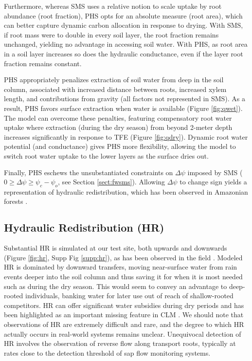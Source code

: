 \documentclass[draft,linenumbers]{agujournal}
\begin{document}
        Furthermore, whereas SMS uses a relative notion to scale uptake by root abundance (root fraction), PHS opts for an absolute measure (root area), which can better capture dynamic carbon allocation in response to drying.
    With SMS, if root mass were to double in every soil layer, the root fraction remains unchanged, yielding no advantage in accessing soil water.
    With PHS, as root area in a soil layer increases so does the hydraulic conductance, even if the layer root fraction remains constant.
    
    PHS appropriately penalizes extraction of soil water from deep in the soil column, associated with increased distance between roots, increased xylem length, and contributions from gravity (all factors not represented in SMS).
    As a result, PHS favors surface extraction when water is available (Figure \ref{fig:qwet}).
    The model can overcome these penalties, featuring compensatory root water uptake where extraction (during the dry season) from beyond 2-meter depth increases significantly in response to TFE (Figure \ref{fig:qdry}).
    Dynamic root water potential (and conductance) gives PHS more flexibility, allowing the model to switch root water uptake to the lower layers as the surface dries out.
   
     Finally, PHS eschews the unsubstantiated constraints on $\Delta\psi$ imposed by SMS ($0\ge\Delta\psi\ge\psi_c-\psi_o$, see Section \ref{sect:fwsms}).
    Allowing $\Delta\psi$ to change sign yields a representation of hydraulic redistribution, which has been observed in Amazonian forests \citep{oliveira2005}.
    
\subsection{Hydraulic Redistribution (HR)}
    Substantial HR is simulated at our test site, both upwards and downwards (Figure \ref{fig:hr}, Supp Fig \ref{supp:hr}), as has been observed in the field \citep{burgess1998}.
    Modeled HR is dominated by downward transfers, moving near-surface water from rain events deeper into the soil column and thus saving it for when it is most needed such as during the dry season.
    This would seem to convey an advantage to deep-rooted individuals, banking water for later use out of reach of shallow-rooted competitors.
    HR can offer significant water subsidies during dry periods \citep{jackson2000} and has been highlighted as an important missing feature in CLM \citep{lee2005}. We should note that observations of HR are extremely difficult and rare, and the degree to which HR actually occurs in real-world systems remains unclear. 
    Unequivocal detection of HR involves the observation of reverse flow along transport roots, typically at rates close to the detection threshold of sap flow monitoring systems. 
    
\end{document}

